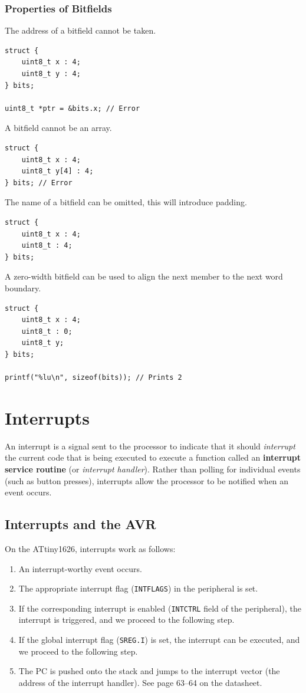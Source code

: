 \documentclass[a4paper]{report}
\begin{document}
\subsection{Properties of Bitfields}
The address of a bitfield cannot be taken.
\begin{verbatim}
struct {
    uint8_t x : 4;
    uint8_t y : 4;
} bits;

uint8_t *ptr = &bits.x; // Error
\end{verbatim}
A bitfield cannot be an array.
\begin{verbatim}
struct {
    uint8_t x : 4;
    uint8_t y[4] : 4;
} bits; // Error
\end{verbatim}
The name of a bitfield can be omitted, this will introduce padding.
\begin{verbatim}
struct {
    uint8_t x : 4;
    uint8_t : 4;
} bits;
\end{verbatim}
A zero-width bitfield can be used to align the next member
to the next word boundary.
\begin{verbatim}
struct {
    uint8_t x : 4;
    uint8_t : 0;
    uint8_t y;
} bits;

printf("%lu\n", sizeof(bits)); // Prints 2
\end{verbatim}
\chapter{Interrupts}
An interrupt is a signal sent to the processor to indicate that it should \textit{interrupt}
the current code that is being executed to execute a function called an \textbf{interrupt service routine} (or \textit{interrupt handler}).
Rather than polling for individual events (such as button presses), interrupts allow the processor to be notified when an event occurs.
\section{Interrupts and the AVR}
On the ATtiny1626, interrupts work as follows:
\begin{enumerate}
    \item An interrupt-worthy event occurs.
    \item The appropriate interrupt flag (\texttt{INTFLAGS}) in the peripheral is set.
    \item If the corresponding interrupt is enabled (\texttt{INTCTRL} field of the peripheral), the interrupt is triggered, and we proceed to the following step.
    \item If the global interrupt flag (\texttt{SREG.I}) is set, the interrupt can be executed, and we proceed to the following step.
    \item The PC is pushed onto the stack and jumps to the interrupt vector (the address of the interrupt handler).
          See page 63--64 on the datasheet.
\end{enumerate}
\end{document}
